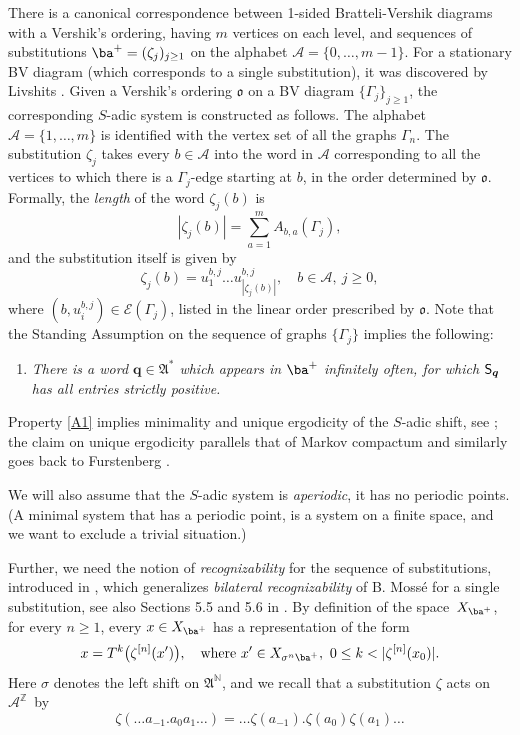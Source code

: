 \documentclass[10pt]{amsart}
\let\mathcal\mathscr
\theoremstyle{plain}
\theoremstyle{definition}
\newcommand\bq{{\boldsymbol q}}
\let\Gam\Gamma
\let\sig\sigma
\newcommand\ok{\mathfrak{o}}
\newcommand\FrA{\mathfrak{A}}
\newcommand\Ak{\mathcal{A}}
\newcommand\A{\mathcal{A}}
\newcommand{\Ek}{\mathcal{E}}
\newcommand{\Z}{\mathbb{Z}}
\newcommand{\N}{\mathbb{N}}
\newcommand\Sf{{\sf S}}
\newcommand\be{\begin{equation}}
\newcommand\ee{\end{equation}}
\begin{document}
There is a canonical correspondence between 1-sided Bratteli-Vershik diagrams with a Vershik's ordering, having $m$ vertices on each level, and sequences of substitutions $\ba^+=(\zeta_j)_{j\ge 1}$ on the alphabet
$\Ak = \{0,\ldots,m-1\}$. For a stationary BV diagram (which corresponds to a single substitution), it was discovered by Livshits \cite{Liv1}.
Given a Vershik's ordering $\ok$ on a BV diagram
$\{\Gam_{j}\}_{j\ge 1}$, the corresponding $S$-adic system is constructed as follows. The
alphabet $\Ak = \{1,\ldots,m\}$ is identified with the vertex set of all the graphs $\Gam_n$.
The substitution $\zeta_j$ takes every $b\in \A$ into the word in $\A$ corresponding to all the vertices to which
there is a $\Gam_{j}$-edge starting at $b$, in the order determined by $\ok$. Formally, the \emph{length} of the word $\zeta_j(b)$ is
\[
|\zeta_j(b)| = \sum_{a=1}^m A_{b,a}(\Gam_j),
\]
and the substitution itself is given by
\be \label{def-subs1}
\zeta_j(b) =u_1^{b,j}\dots u_{|\zeta_j(b)|}^{b,j},\quad b\in \A,\ j\ge 0,
\ee
where $(b, u_i^{b,j})\in \Ek(\Gam_j)$, listed in the linear order prescribed by $\ok$. Note that the Standing Assumption on the sequence of graphs $\{\Gam_j\}$ implies the following:
\begin{enumerate}\renewcommand{\theenumi}{A\arabic{enumi}}
\item\label{A1}
\emph{There is a word $\bq\in \FrA^*$ which appears in $\ba^+$ infinitely often, for which $\Sf_\bq$ has all entries strictly positive.}
\end{enumerate}

Property \eqref{A1} implies minimality and unique ergodicity of the $S$-adic shift, see \hbox{\cite[Th.\,5.2 \& 5.7]{BD}}; the claim on unique ergodicity parallels that of Markov compactum and similarly goes back to Furstenberg \cite[(16.13)]{furst}.

We will also assume that the $S$-adic system is \emph{aperiodic}, \ie it has no periodic points. (A minimal system that has a periodic point, is a system on a finite space, and we want to exclude a trivial situation.)

Further, we need the notion of \emph{recognizability} for the sequence of substitutions, introduced
in \cite{BSTY}, which generalizes \emph{bilateral recognizability} of B. Mossé \cite{Mosse} for a single substitution, see also Sections 5.5 and 5.6 in \cite{Queff}. By definition of the space~$X_{\ba^+}$, for every $n\ge 1$, every $x\in X_{\ba^+}$ has a representation of the form
\be \label{recog}
x = T^k\bigl(\zeta^{[n]}(x')\bigr),\quad \text{where } x'\in X_{\sig^n \ba^+},\ 0\le k < |\zeta^{[n]}(x_0)|.
\ee
Here $\sig$ denotes the left shift on $\FrA^\N$, and we recall that a substitution $\zeta$ acts on~$\Ak^\Z$~by
\[
\zeta(\ldots a_{-1}.a_0 a_1\ldots) = \ldots \zeta(a_{-1}).\zeta(a_0)\zeta(a_1)\ldots
\]
\end{document}
